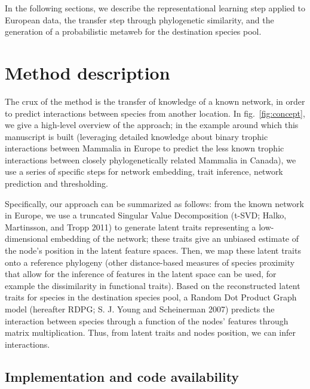\documentclass[11pt]{article}
\begin{document}
In the following sections, we describe the representational learning
step applied to European data, the transfer step through phylogenetic
similarity, and the generation of a probabilistic metaweb for the
destination species pool.

\hypertarget{method-description}{%
\section{Method description}\label{method-description}}

The crux of the method is the transfer of knowledge of a known network,
in order to predict interactions between species from another location.
In fig.~\ref{fig:concept}, we give a high-level overview of the
approach; in the example around which this manuscript is built
(leveraging detailed knowledge about binary trophic interactions between
Mammalia in Europe to predict the less known trophic interactions
between closely phylogenetically related Mammalia in Canada), we use a
series of specific steps for network embedding, trait inference, network
prediction and thresholding.

Specifically, our approach can be summarized as follows: from the known
network in Europe, we use a truncated Singular Value Decomposition
(t-SVD; Halko, Martinsson, and Tropp 2011) to generate latent traits
representing a low-dimensional embedding of the network; these traits
give an unbiased estimate of the node's position in the latent feature
spaces. Then, we map these latent traits onto a reference phylogeny
(other distance-based measures of species proximity that allow for the
inference of features in the latent space can be used, for example the
dissimilarity in functional traits). Based on the reconstructed latent
traits for species in the destination species pool, a Random Dot Product
Graph model (hereafter RDPG; S. J. Young and Scheinerman 2007) predicts
the interaction between species through a function of the nodes'
features through matrix multiplication. Thus, from latent traits and
nodes position, we can infer interactions.

\hypertarget{implementation-and-code-availability}{%
\subsection{Implementation and code
availability}\label{implementation-and-code-availability}}
\end{document}
